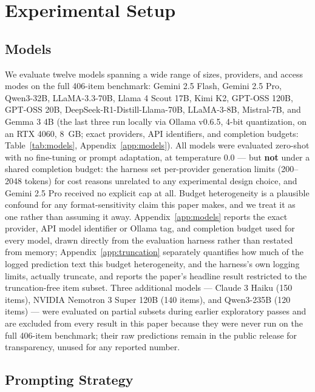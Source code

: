 \section{Experimental Setup}

\subsection{Models}
\label{sec:models}

We evaluate twelve models spanning a wide range of sizes, providers, and access modes on the full
406-item benchmark: Gemini 2.5 Flash, Gemini 2.5 Pro, Qwen3-32B, LLaMA-3.3-70B, Llama 4 Scout 17B,
Kimi K2, GPT-OSS 120B, GPT-OSS 20B, DeepSeek-R1-Distill-Llama-70B, LLaMA-3-8B, Mistral-7B, and
Gemma 3 4B (the last three run locally via Ollama v0.6.5, 4-bit quantization, on an RTX 4060,
8~GB; exact providers, API identifiers, and completion budgets: Table~\ref{tab:models},
Appendix~\ref{app:models}). All models were evaluated zero-shot with no fine-tuning or prompt
adaptation, at temperature 0.0 --- but \textbf{not} under a shared completion budget: the harness set
per-provider generation limits (200--2048 tokens) for cost reasons unrelated to any experimental
design choice, and Gemini 2.5 Pro received no explicit cap at all. Budget heterogeneity is a
plausible confound for any format-sensitivity claim this paper makes, and we treat it as one rather
than assuming it away. Appendix~\ref{app:models} reports the exact provider, API model identifier or
Ollama tag, and completion budget used for every model, drawn directly from the evaluation harness
rather than restated from memory; Appendix~\ref{app:truncation} separately quantifies how much of the
logged prediction text this budget heterogeneity, and the harness's own logging limits, actually
truncate, and reports the paper's headline result restricted to the truncation-free item subset.
Three additional models --- Claude 3 Haiku (150 items), NVIDIA Nemotron 3 Super 120B (140 items),
and Qwen3-235B (120 items) --- were evaluated on partial subsets during earlier exploratory passes
and are excluded from every result in this paper because they were never run on the full 406-item
benchmark; their raw predictions remain in the public release for transparency, unused for any
reported number.

\subsection{Prompting Strategy}

